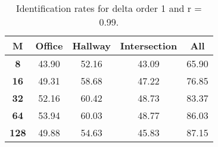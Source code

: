 \begin{table}[h]
    \small
    \centering
    \begin{tabular}{|c|c|c|c|l|}    
    \hline
    {\bf M} & {\bf Office} & {\bf Hallway} & {\bf Intersection} &     \multicolumn{1}{c|}{{\bf All}} \\ \hline
    {\bf 8} & 43.90 & 52.16 & 43.09 & 65.90 \\ \hline
    {\bf 16} & 49.31 & 58.68 & 47.22 & 76.85 \\ \hline
    {\bf 32} & 52.16 & 60.42 & 48.73 & 83.37 \\ \hline
    {\bf 64} & 53.94 & 60.03 & 48.77 & 86.03 \\ \hline
    {\bf 128} & 49.88 & 54.63 & 45.83 & 87.15 \\ \hline
    \end{tabular}
    \caption{Identification rates for delta order 1 and r = 0.99.}    
    \label{tab:identify_speakers_0.99_mit_19_1}
\end{table}
